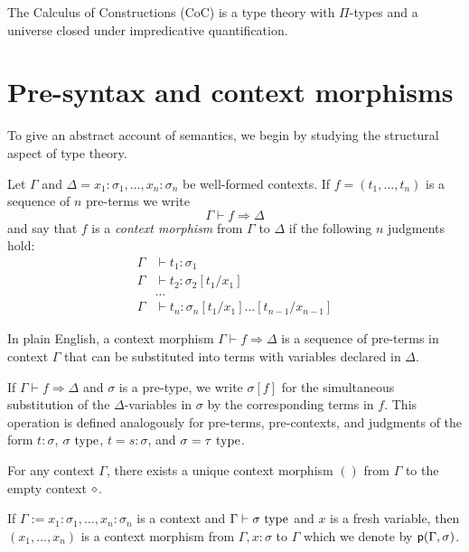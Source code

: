 \documentclass[a4paper]{article}
\begin{document}
The Calculus of Constructions (CoC) is a type theory with $\Pi$-types and a universe closed under impredicative quantification.

\section{Pre-syntax and context morphisms}\label{sec:pscm}

To give an abstract account of semantics, we begin by studying the structural aspect of type theory.

\begin{definition}[Hofmann]
  Let $\Gamma$ and $\Delta = x_1 : \sigma_1,\ldots,x_n : \sigma_n$ be well-formed contexts.
  If $f = (t_1,\ldots,t_n)$ is a sequence of $n$ pre-terms we write
  \[
    \Gamma \vdash f \Rightarrow \Delta
  \]
  and say that $f$ is a \emph{context morphism} from $\Gamma$ to $\Delta$ if the following $n$ judgments hold:
  \begin{align*}
    \Gamma &\vdash t_1 : \sigma_1\\
    \Gamma &\vdash t_2 : \sigma_2[t_1/x_1]\\
    &\ldots\\
    \Gamma &\vdash t_n : \sigma_n[t_1/x_1]\ldots[t_{n-1}/x_{n-1}]
  \end{align*}
\end{definition}

In plain English, a context morphism $\Gamma \vdash f \Rightarrow \Delta$ is a sequence of pre-terms in context $\Gamma$ that can be substituted into terms with variables declared in $\Delta$.

If $\Gamma \vdash f \Rightarrow \Delta$ and $\sigma$ is a pre-type, we write $\sigma[f]$ for the simultaneous substitution of the $\Delta$-variables in $\sigma$ by the corresponding terms in $f$.
This operation is defined analogously for pre-terms, pre-contexts, and judgments of the form $t : \sigma$, $\sigma~\mathrm{type}$, $t = s : \sigma$, and $\sigma = \tau~\mathrm{type}$.

\begin{example}
  For any context $\Gamma$, there exists a unique context morphism $()$ from $\Gamma$ to the empty context $\diamond$.
\end{example}

\begin{example}
  If $\Gamma := x_1 : \sigma_1,\ldots,x_{n} : \sigma_n$ is a context and $\Gamma \vdash \sigma~\mathrm{type}$ and $x$ is a fresh variable, then $(x_1,\ldots,x_n)$ is a context morphism from $\Gamma, x : \sigma$ to $\Gamma$ which we denote by $\operatorname{\mathsf{p}}(\Gamma,\sigma)$.
\end{example}
\end{document}
